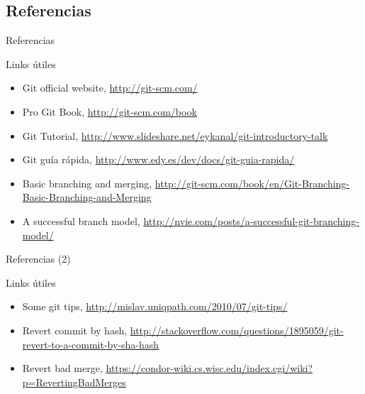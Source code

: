 \documentclass{beamer}
\begin{document}
\subsection{Referencias}

\begin{frame}{Referencias}
 \begin{block}{Links útiles}
    \begin{itemize}
     \item Git official website, \url{http://git-scm.com/}
     \item Pro Git Book, \url{http://git-scm.com/book}
     \item Git Tutorial, \url{http://www.slideshare.net/eykanal/git-introductory-talk}
     \item Git guía rápida, \url{http://www.edy.es/dev/docs/git-guia-rapida/}
     \item Basic branching and merging, \url{http://git-scm.com/book/en/Git-Branching-Basic-Branching-and-Merging}
     \item A successful branch model, \url{http://nvie.com/posts/a-successful-git-branching-model/}
    \end{itemize}

 \end{block}
\end{frame}

\begin{frame}{Referencias (2)}
 \begin{block}{Links útiles}
    \begin{itemize}
          \item Some git tips, \url{http://mislav.uniqpath.com/2010/07/git-tips/}
     \item Revert commit by hash, \url{http://stackoverflow.com/questions/1895059/git-revert-to-a-commit-by-sha-hash}
     \item Revert bad merge, \url{https://condor-wiki.cs.wisc.edu/index.cgi/wiki?p=RevertingBadMerges}
    \end{itemize}

 \end{block}
\end{frame}
\end{document}
